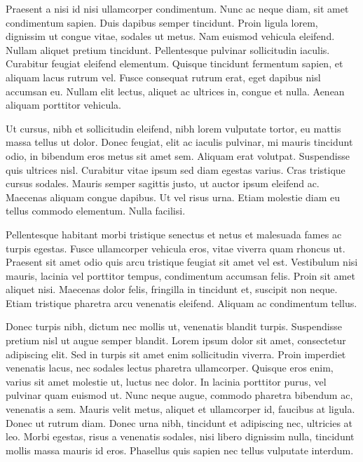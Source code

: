 \documentclass[a4paper]{article}
\begin{document}
Praesent a nisi id nisi ullamcorper condimentum. Nunc ac neque diam, sit amet condimentum sapien. Duis dapibus semper tincidunt. Proin ligula lorem, dignissim ut congue vitae, sodales ut metus. Nam euismod vehicula eleifend. Nullam aliquet pretium tincidunt. Pellentesque pulvinar sollicitudin iaculis. Curabitur feugiat eleifend elementum. Quisque tincidunt fermentum sapien, et aliquam lacus rutrum vel. Fusce consequat rutrum erat, eget dapibus nisl accumsan eu. Nullam elit lectus, aliquet ac ultrices in, congue et nulla. Aenean aliquam porttitor vehicula.

Ut cursus, nibh et sollicitudin eleifend, nibh lorem vulputate tortor, eu mattis massa tellus ut dolor. Donec feugiat, elit ac iaculis pulvinar, mi mauris tincidunt odio, in bibendum eros metus sit amet sem. Aliquam erat volutpat. Suspendisse quis ultrices nisl. Curabitur vitae ipsum sed diam egestas varius. Cras tristique cursus sodales. Mauris semper sagittis justo, ut auctor ipsum eleifend ac. Maecenas aliquam congue dapibus. Ut vel risus urna. Etiam molestie diam eu tellus commodo elementum. Nulla facilisi.

Pellentesque habitant morbi tristique senectus et netus et malesuada fames ac turpis egestas. Fusce ullamcorper vehicula eros, vitae viverra quam rhoncus ut. Praesent sit amet odio quis arcu tristique feugiat sit amet vel est. Vestibulum nisi mauris, lacinia vel porttitor tempus, condimentum accumsan felis. Proin sit amet aliquet nisi. Maecenas dolor felis, fringilla in tincidunt et, suscipit non neque. Etiam tristique pharetra arcu venenatis eleifend. Aliquam ac condimentum tellus.

Donec turpis nibh, dictum nec mollis ut, venenatis blandit turpis. Suspendisse pretium nisl ut augue semper blandit. Lorem ipsum dolor sit amet, consectetur adipiscing elit. Sed in turpis sit amet enim sollicitudin viverra. Proin imperdiet venenatis lacus, nec sodales lectus pharetra ullamcorper. Quisque eros enim, varius sit amet molestie ut, luctus nec dolor. In lacinia porttitor purus, vel pulvinar quam euismod ut. Nunc neque augue, commodo pharetra bibendum ac, venenatis a sem. Mauris velit metus, aliquet et ullamcorper id, faucibus at ligula. Donec ut rutrum diam. Donec urna nibh, tincidunt et adipiscing nec, ultricies at leo. Morbi egestas, risus a venenatis sodales, nisi libero dignissim nulla, tincidunt mollis massa mauris id eros. Phasellus quis sapien nec tellus vulputate interdum.
\end{document}
